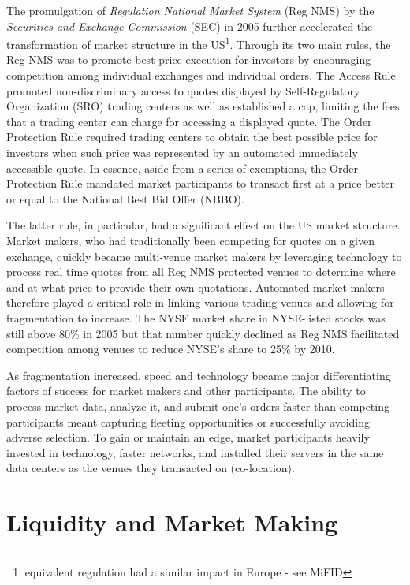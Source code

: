 The promulgation of \textit{Regulation National Market System} (Reg NMS) by the  \textit{Securities and Exchange Commission} (SEC) in 2005 further accelerated the transformation of market structure in the US\footnote{equivalent regulation had a similar impact in Europe - see MiFID}. Through its two main rules, the Reg NMS was to promote best price execution for investors by encouraging competition among individual exchanges and individual orders. The Access Rule promoted non-discriminary access to quotes displayed by Self-Regulatory Organization (SRO) trading centers as well as established a cap, limiting the fees that a trading center can charge for accessing a displayed quote. The Order Protection Rule required trading centers to obtain the best possible price for investors when such price was represented by an automated immediately accessible quote. In essence, aside from a series of exemptions, the Order Protection Rule mandated market participants to transact first at a price better or equal to the National Best Bid Offer (NBBO). 


The latter rule, in particular, had a significant effect on the US market structure. Market makers, who had traditionally been competing for quotes on a given exchange, quickly became multi-venue market makers by leveraging technology to process real time  quotes from all Reg NMS protected venues to determine where and at what price to provide their own quotations. Automated market makers therefore played a critical role in linking various trading venues and allowing for fragmentation to increase. The NYSE market share in NYSE-listed stocks was still above 80\% in 2005 but that number quickly declined as Reg NMS facilitated competition among venues to reduce NYSE's share to 25\% by 2010. 


As fragmentation increased, speed and technology became major differentiating factors of success for market makers and other participants. The ability to process market data, analyze it, and submit one's orders faster than competing participants meant capturing fleeting opportunities or successfully avoiding adverse selection. To gain or maintain an edge, market participants heavily invested in technology, faster networks, and installed their servers in the same data centers as the venues they transacted on (co-location). 


\section{Liquidity and Market Making}


